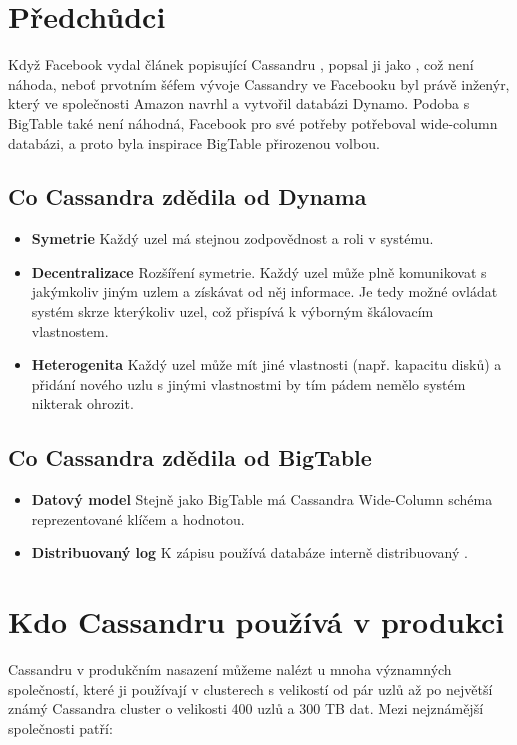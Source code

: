 \section{Předchůdci}

Když Facebook vydal článek popisující Cassandru \cite{facebookcassandra}, popsal ji jako , což není náhoda, neboť prvotním šéfem vývoje Cassandry ve Facebooku byl právě inženýr, který ve společnosti Amazon navrhl a vytvořil databázi Dynamo. Podoba s BigTable také není náhodná, Facebook pro své potřeby potřeboval wide-column databázi, a proto byla inspirace BigTable přirozenou volbou. 

\subsection{Co Cassandra zdědila od Dynama}
\begin{itemize}
\item \textbf{Symetrie} Každý uzel má stejnou zodpovědnost a roli v systému.
\item \textbf{Decentralizace} Rozšíření symetrie. Každý uzel může plně komunikovat s jakýmkoliv jiným uzlem a získávat od něj informace. Je tedy možné ovládat systém skrze kterýkoliv uzel, což přispívá k výborným škálovacím vlastnostem. 
\item \textbf{Heterogenita} Každý uzel může mít jiné vlastnosti (např. kapacitu disků) a přidání nového uzlu s jinými vlastnostmi by tím pádem nemělo systém nikterak ohrozit. 
\end{itemize} 

\subsection{Co Cassandra zdědila od BigTable}
\begin{itemize}
\item \textbf{Datový model} Stejně jako BigTable má Cassandra Wide-Column schéma reprezentované klíčem a hodnotou.
\item \textbf{Distribuovaný log} K zápisu používá databáze interně distribuovaný . 
\end{itemize} 

\section{Kdo Cassandru používá v produkci}

Cassandru v produkčním nasazení můžeme nalézt u mnoha významných společností, které ji používají v clusterech s velikostí od pár uzlů až po největší známý Cassandra cluster o velikosti 400 uzlů a 300 TB dat. Mezi nejznámější společnosti patří:

